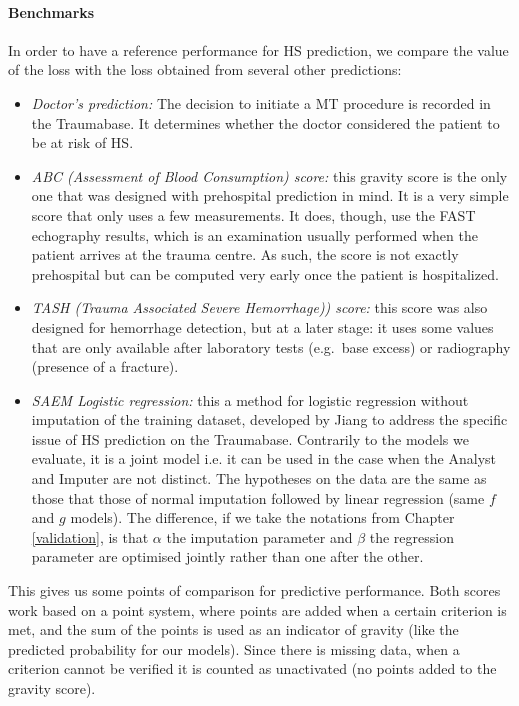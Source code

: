 \paragraph{Benchmarks}
In order to have a reference performance for HS prediction, we compare the value of the loss with the loss obtained from several other predictions:
\begin{itemize}
\item \emph{Doctor's prediction:} The decision to initiate a MT procedure is recorded in the Traumabase. It determines whether the doctor considered the patient to be at risk of HS.
\item \emph{ABC (Assessment of Blood Consumption)\cite{nunez2009ABC} score:} this gravity score is the only one that was designed with prehospital prediction in mind. It is a very simple score that only uses a few measurements. It does, though, use the FAST echography results, which is an examination usually performed when the patient arrives at the trauma centre. As such, the score is not exactly prehospital but can be computed very early once the patient is hospitalized.
\item \emph{TASH (Trauma Associated Severe Hemorrhage)\cite{yucel2006tash}) score:} this score was also designed for hemorrhage detection, but at a later stage: it uses some values that are only available after laboratory tests (e.g.\ base excess) or radiography (presence of a fracture).
\item \emph{SAEM Logistic regression:} this a method for logistic regression without imputation of the training dataset, developed by Jiang \cite{jiangsaem} to address the specific issue of HS prediction on the Traumabase. Contrarily to the models we evaluate, it is a joint model i.e. it can be used in the case when the Analyst and Imputer are not distinct. The hypotheses on the data are the same as those that those of normal imputation followed by linear regression (same $f$ and $g$ models). The difference, if we take the notations from Chapter \ref{validation}, is that $\alpha$ the imputation parameter and $\beta$ the regression parameter are optimised jointly rather than one after the other. 
\end{itemize}

This gives us some points of comparison for predictive performance. Both scores work based on a point system, where points are added when a certain criterion is met, and the sum of the points is used as an indicator of gravity (like the predicted probability for our models). Since there is missing data, when a criterion cannot be verified it is counted as unactivated (no points added to the gravity score).

